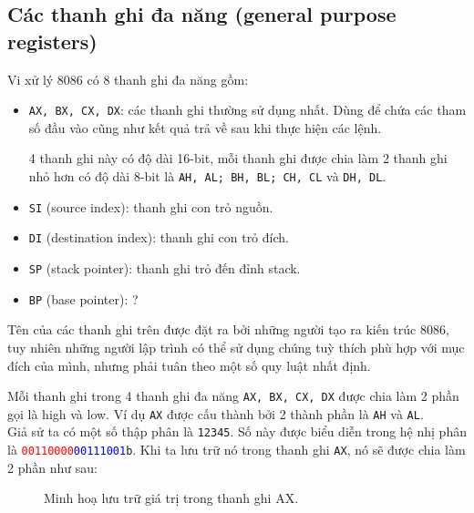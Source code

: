 \documentclass[12pt]{report}
\newcommand{\code}[1]{\texttt{#1}}
\begin{document}
\subsection*{Các thanh ghi đa năng (general purpose registers)}
Vi xử lý 8086 có 8 thanh ghi đa năng gồm:
\begin{itemize}
    \item \code{AX, BX, CX, DX}: các thanh ghi thường sử dụng nhất. Dùng để chứa các tham số đầu vào cũng như kết quả trả về sau khi thực hiện các lệnh.
    \par 4 thanh ghi này có độ dài 16-bit, mỗi thanh ghi được chia làm 2 thanh ghi nhỏ hơn có độ dài 8-bit là \code{AH, AL; BH, BL; CH, CL} và \code{DH, DL}.
    \item \code{SI} (source index): thanh ghi con trỏ nguồn.
    \item \code{DI} (destination index): thanh ghi con trỏ đích.
    \item \code{SP} (stack pointer): thanh ghi trỏ đến đỉnh stack.
    \item \code{BP} (base pointer): ?
\end{itemize}

Tên của các thanh ghi trên được đặt ra bởi những người tạo ra kiến trúc 8086, tuy nhiên những người lập trình có thể sử dụng chúng tuỳ thích phù hợp với mục đích của mình, nhưng phải tuân theo một số quy luật nhất định.\bigskip

Mỗi thanh ghi trong 4 thanh ghi đa năng \code{AX, BX, CX, DX} được chia làm 2 phần gọi là high và low. Ví dụ \code{AX} được cấu thành bởi 2 thành phần là \code{AH} và \code{AL}.\\
Giả sử ta có một số thập phân là \code{12345}. Số này được biểu diễn trong hệ nhị phân là \textcolor{red}{\code{00110000}}\textcolor{blue}{\code{00111001}}\code{b}. Khi ta lưu trữ nó trong thanh ghi \code{AX}, nó sẽ được chia làm 2 phần như sau:

\begin{figure}[H]
    \centering
    \caption{Minh hoạ lưu trữ giá trị trong thanh ghi AX.}
\end{figure}
\end{document}
